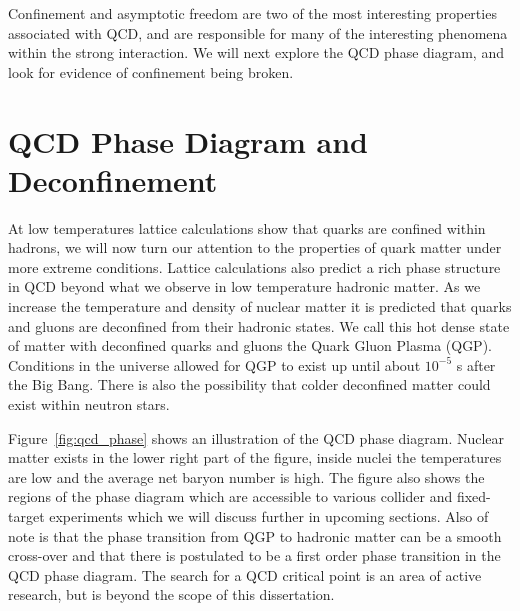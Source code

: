 Confinement and asymptotic freedom are two of the most interesting properties associated with QCD, and are responsible for many of the interesting phenomena within the strong interaction. We will next explore the QCD phase diagram, and look for evidence of confinement being broken.  

\section{QCD Phase Diagram and Deconfinement}

At low temperatures lattice calculations show that quarks are confined within hadrons, we will now turn our attention to the properties of quark matter under more extreme conditions. Lattice calculations also predict a rich phase structure in QCD beyond what we observe in low temperature hadronic matter. As we increase the temperature and density of nuclear matter it is predicted that quarks and gluons are deconfined from their hadronic states. We call this hot dense state of matter with deconfined quarks and gluons the Quark Gluon Plasma (QGP). Conditions in the universe allowed for QGP to exist up until about $10^{-5}$ s after the Big Bang. There is also the possibility that colder deconfined matter could exist within neutron stars.

Figure~\ref{fig:qcd_phase} shows an illustration of the QCD phase diagram. Nuclear matter exists in the lower right part of the figure, inside nuclei the temperatures are low and the average net baryon number is high. The figure also shows the regions of the phase diagram which are accessible to various collider and fixed-target experiments which we will discuss further in upcoming sections. Also of note is that the phase transition from QGP to hadronic matter can be a smooth cross-over and that there is postulated to be a first order phase transition in the QCD phase diagram. The search for a QCD critical point is an area of active research, but is beyond the scope of this dissertation. 


